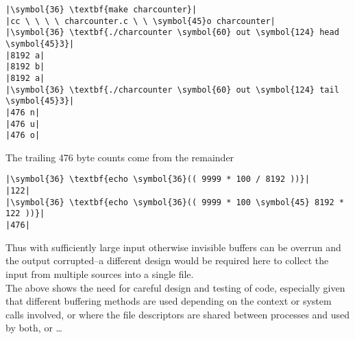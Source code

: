 \documentclass[10pt,a4paper]{article}
\begin{document}
\begin{lstlisting}
|\symbol{36} \textbf{make charcounter}|
|cc \ \ \ \ charcounter.c \ \ \symbol{45}o charcounter|
|\symbol{36} \textbf{./charcounter \symbol{60} out \symbol{124} head \symbol{45}3}|
|8192 a|
|8192 b|
|8192 a|
|\symbol{36} \textbf{./charcounter \symbol{60} out \symbol{124} tail \symbol{45}3}|
|476 n|
|476 u|
|476 o|
\end{lstlisting}

The trailing 476 byte counts come from the remainder

\begin{lstlisting}
|\symbol{36} \textbf{echo \symbol{36}(( 9999 * 100 / 8192 ))}|
|122|
|\symbol{36} \textbf{echo \symbol{36}(( 9999 * 100 \symbol{45} 8192 * 122 ))}|
|476|
\end{lstlisting}

Thus with sufficiently large input otherwise invisible buffers can be
overrun and the output corrupted--a different design would be required
here to collect the input from multiple sources into a single file. \\

The above shows the need for careful design and testing of code,
especially given that different buffering methods are used depending on
the context or system calls involved, or where the file descriptors are
shared between processes and used by both, or \ldots
\end{document}
